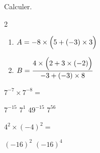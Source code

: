 \documentclass[a4paper,11pt,fleqn]{article}
\begin{document}
\begin{EXO}{}{}
Calculer.

\begin{multicols}{2}
\begin{enumerate}[itemsep=1em,label={}]
	\item \begin{minipage}[t]{\linewidth} $A = -8 \times \Bigl(5 + \left(-3\right) \times 3\Bigr)$ \end{minipage}
	\item \begin{minipage}[t]{\linewidth} $B = \dfrac{4 \times \Bigl(2 + 3 \times \left(-2\right)\Bigr)}{-3 + \left(-3\right) \times 8}$ \end{minipage}
\end{enumerate}
\end{multicols}
\end{EXO}

\begin{EXO}{}{}



 $7^{-7}\times 7^{-8}$$=$\medskip

\begin{qcmprop}[cols=4]
  \task $7^{-15}$
  \task $7^{1}$
  \task $49^{-15}$
  \task $7^{56}$
\end{qcmprop}

\end{EXO}

\begin{EXO}{}{}



 $4^{2}\times (-4)^{2}$$=$\medskip

\begin{qcmprop}[cols=2]
  \task $(-16)^{2}$
  \task $(-16)^{4}$
\end{qcmprop}

\end{EXO}
\end{document}
